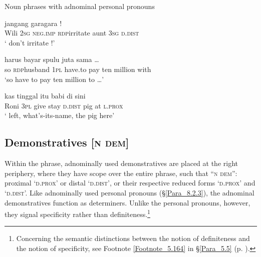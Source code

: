\begin{styleExampleTitle}
Noun phrases with adnominal personal pronouns
\end{styleExampleTitle}
\ea
\label{Example_8.43}
 {} {jangang} {gara{\Tilde}gara} {} {} {}!\\ %
 Wili  \textsc{2sg}  \textsc{neg.imp}  \textsc{rdp}{\Tilde}irritate  aunt  \textsc{3sg}  \textsc{d.dist}\\
\glt 
‘ don’t irritate !’ \textstyleExampleSource{[081023-001-Cv.0038]}
\z

\ea
\label{Example_8.44}
 {} {} {harus} {bayar} {spulu} {juta} {sama} {\ldots}\\ %
 so  \textsc{rdp}{\Tilde}husband  \textsc{1pl}  have.to  pay  ten  million  with  \\
\glt 
‘so  have to pay ten million to {\ldots}’ \textstyleExampleSource{[081110-005-CvPr.0107]}
\z

\ea
\label{Example_8.45}
 {} {kas} {tinggal} {itu} {babi} {di} {sini}\\ %
 Roni  \textsc{3pl}  give  stay  \textsc{d.dist}  pig  at  \textsc{l.prox}\\
\glt
‘ left, what’s-its-name, the pig here’ \textstyleExampleSource{[080917-008-NP.0135]}
\z


\subsection{Demonstratives [\textsc{n} \textsc{dem}]}
\label{Para_8.2.4}
Within the  phrase, adnominally used demonstratives are placed at the right periphery, where they have scope over the entire  phrase, such that ``\textsc{n} \textsc{dem}'': proximal  ‘\textsc{d.prox}’ or distal  ‘\textsc{d.dist}’, or their respective reduced forms  ‘\textsc{d.prox}’ and  ‘\textsc{d.dist}’. Like adnominally used personal pronouns (§\ref{Para_8.2.3}), the adnominal demonstratives function as determiners. Unlike the personal pronouns, however, they signal specificity rather than definiteness.\footnote{Concerning the semantic distinctions between the notion of definiteness and the notion of specificity, see Footnote \ref{Footnote_5.164} in §\ref{Para_5.5} (p. \pageref{Footnote_5.164}).
}



